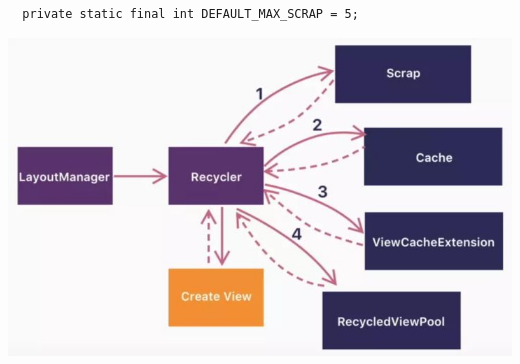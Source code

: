 \documentclass[9pt, b5paper]{article}
\begin{document}
\begin{verbatim}
  private static final int DEFAULT_MAX_SCRAP = 5;
\end{verbatim}

\includegraphics[width=.9\linewidth]{./pic/recyclerviewcache.jpg}
\end{document}
